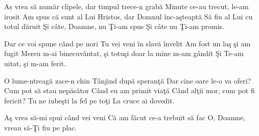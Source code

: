 
\beginverse
Aș vrea să număr clipele, dar timpul trece-n grabă
Minute ce-au trecut, le-am irosit
Am spus că sunt al Lui Hristos, dar Domnul înc-aşteaptă
Să fiu al Lui cu totul dăruit
Şi câte, Doamne, nu Ţi-am spus
Şi câte nu Ţi-am promis.
\endverse

\beginchorus
Dar ce voi spune când pe nori
Tu vei veni în slavă învelit
Am fost un laş şi am fugit
Mereu m-ai binecuvântat,
şi totuşi doar la mine m-am gândit
Şi Te-am uitat, şi m-am ferit.
\endchorus

\beginverse
O lume-ntreagă zace-n chin
Tânjind după speranţă
Dar cine oare le-o va oferi?
Cum pot să stau nepăsător
Când eu am primit viaţă
Când alţii mor, cum pot fi fericit?
Tu ne iubeşti la fel pe toţi
La cruce ai dovedit.
\endverse

\beginchorus
Aş vrea să-mi spui când vei veni
Că am făcut ce-a trebuit să fac
O, Doamne, vreau să-Ţi fiu pe plac.
\endchorus

\endsong